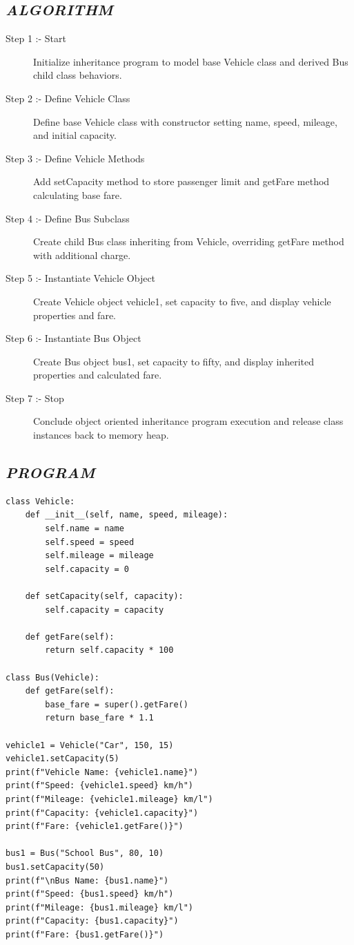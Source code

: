 \documentclass[11pt,a4paper]{article}
\begin{document}
\subsection*{\textit{ALGORITHM}}
\begin{description}
  \item[Step 1 :- Start] Initialize inheritance program to model base Vehicle class and derived Bus child class behaviors.
  \item[Step 2 :- Define Vehicle Class] Define base Vehicle class with constructor setting name, speed, mileage, and initial capacity.
  \item[Step 3 :- Define Vehicle Methods] Add setCapacity method to store passenger limit and getFare method calculating base fare.
  \item[Step 4 :- Define Bus Subclass] Create child Bus class inheriting from Vehicle, overriding getFare method with additional charge.
  \item[Step 5 :- Instantiate Vehicle Object] Create Vehicle object vehicle1, set capacity to five, and display vehicle properties and fare.
  \item[Step 6 :- Instantiate Bus Object] Create Bus object bus1, set capacity to fifty, and display inherited properties and calculated fare.
  \item[Step 7 :- Stop] Conclude object oriented inheritance program execution and release class instances back to memory heap.
\end{description}

\subsection*{\textit{PROGRAM}}
\begin{lstlisting}[style=pythonstyle]
class Vehicle: 
    def __init__(self, name, speed, mileage): 
        self.name = name 
        self.speed = speed 
        self.mileage = mileage 
        self.capacity = 0 
 
    def setCapacity(self, capacity): 
        self.capacity = capacity 

    def getFare(self): 
        return self.capacity * 100 
 
class Bus(Vehicle): 
    def getFare(self): 
        base_fare = super().getFare() 
        return base_fare * 1.1 
 
vehicle1 = Vehicle("Car", 150, 15) 
vehicle1.setCapacity(5) 
print(f"Vehicle Name: {vehicle1.name}") 
print(f"Speed: {vehicle1.speed} km/h") 
print(f"Mileage: {vehicle1.mileage} km/l") 
print(f"Capacity: {vehicle1.capacity}") 
print(f"Fare: {vehicle1.getFare()}") 
 
bus1 = Bus("School Bus", 80, 10) 
bus1.setCapacity(50) 
print(f"\nBus Name: {bus1.name}") 
print(f"Speed: {bus1.speed} km/h") 
print(f"Mileage: {bus1.mileage} km/l") 
print(f"Capacity: {bus1.capacity}") 
print(f"Fare: {bus1.getFare()}")
\end{lstlisting}
\end{document}
